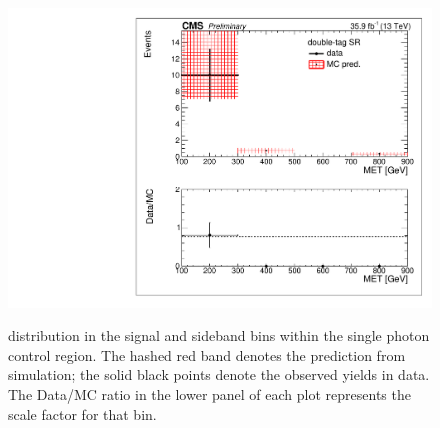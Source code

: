 \begin{figure}[hbp!]
 \includegraphics[trim={5px 5px 5px 5px},clip,width=0.45\linewidth]{figs/ABCDscaleFactors_MET_double-tagSR_photon.pdf}\\
 \caption{
 \ptmiss distribution in the signal and sideband bins within the single photon control region. The hashed red band denotes the prediction from simulation; the solid black points denote the observed yields in data. The Data/MC ratio in the lower panel of each plot represents the scale factor for that bin.
 }
\label{fig:closurephoton}
\end{figure}


